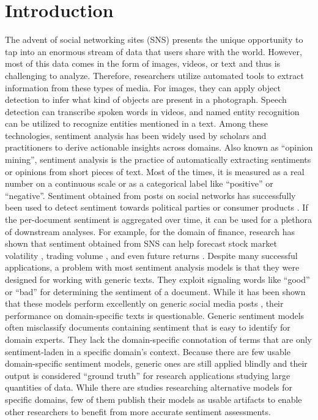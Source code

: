 \section{Introduction}

The advent of social networking sites (SNS) presents the unique opportunity to tap into an enormous stream of data that users share with the world. However, most of this data comes in the form of images, videos, or text and thus is challenging to analyze. Therefore, researchers utilize automated tools to extract information from these types of media. For images, they can apply object detection to infer what kind of objects are present in a photograph. Speech detection can transcribe spoken words in videos, and named entity recognition can be utilized to recognize entities mentioned in a text. Among these technologies, sentiment analysis has been widely used by scholars and practitioners to derive actionable insights across domains. Also known as ``opinion mining'', sentiment analysis is the practice of automatically extracting sentiments or opinions from short pieces of text. Most of the times, it is measured as a real number on a continuous scale or as a categorical label like ``positive'' or ``negative''. Sentiment obtained from posts on social networks has successfully been used to detect sentiment towards political parties  or consumer products \cite{pontiki2016semeval}. If the per-document sentiment is aggregated over time, it can be used for a plethora of downstream analyses. For example, for the domain of finance, research has shown that sentiment obtained from SNS can help forecast stock market volatility , trading volume , and even future returns .\newline
Despite many successful applications, a problem with most sentiment analysis models is that they were designed for working with generic texts. They exploit signaling words like ``good'' or ``bad'' for determining the sentiment of a document. While it has been shown that these models perform excellently on generic social media posts \cite{al2020evaluating}, their performance on domain-specific texts is questionable. Generic sentiment models often misclassify documents containing sentiment that is easy to identify for domain experts. They lack the domain-specific connotation of terms that are only sentiment-laden in a specific domain's context. Because there are few usable domain-specific sentiment models, generic ones are still applied blindly and their output is considered ``ground truth'' for research applications studying large quantities of data. While there are studies researching alternative models for specific domains, few of them publish their models as usable artifacts to enable other researchers to benefit from more accurate sentiment assessments.

